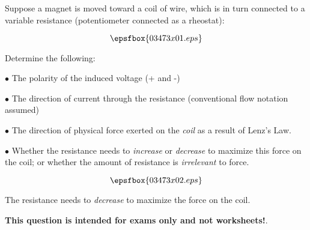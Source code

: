 

Suppose a magnet is moved toward a coil of wire, which is in turn connected to a variable resistance (potentiometer connected as a rheostat):

$$\epsfbox{03473x01.eps}$$

Determine the following:

\medskip
\item{$\bullet$} The polarity of the induced voltage (+ and -)
\item{$\bullet$} The direction of current through the resistance (conventional flow notation assumed)
\item{$\bullet$} The direction of physical force exerted on the {\it coil} as a result of Lenz's Law.
\item{$\bullet$} Whether the resistance needs to {\it increase} or {\it decrease} to maximize this force on the coil; or whether the amount of resistance is {\it irrelevant} to force.
\medskip







$$\epsfbox{03473x02.eps}$$

The resistance needs to {\it decrease} to maximize the force on the coil.







{\bf This question is intended for exams only and not worksheets!}.



